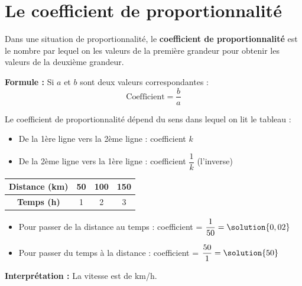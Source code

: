 \clearpage
\seance

\section{Le coefficient de proportionnalité}

\begin{definitionbox}
	Dans une situation de proportionnalité, le \textbf{coefficient de proportionnalité} est le nombre par lequel on  les valeurs de la première grandeur pour obtenir les valeurs de la deuxième grandeur.

	\textbf{Formule :} Si $a$ et $b$ sont deux valeurs correspondantes :
	$$\text{Coefficient} = \dfrac{b}{a}$$
\end{definitionbox}

\begin{remarkbox}
	Le coefficient de proportionnalité dépend du sens dans lequel on lit le tableau :
	\begin{itemize}
		\item De la 1ère ligne vers la 2ème ligne : coefficient $k$
		\item De la 2ème ligne vers la 1ère ligne : coefficient $\dfrac{1}{k}$ (l'inverse)
	\end{itemize}
\end{remarkbox}

\begin{examplebox}
	\begin{center}
		\renewcommand{\arraystretch}{1.5}
		\begin{tabular}{|c|c|c|c|}
			\hline
			\textbf{Distance (km)} & 50 & 100 & 150 \\
			\hline
			\textbf{Temps (h)} & 1 & 2 & 3 \\
			\hline
		\end{tabular}
	\end{center}

	\begin{itemize}
		\item Pour passer de la distance au temps : coefficient = $\dfrac{1}{50} = \solution{0,02}$
		\item Pour passer du temps à la distance : coefficient = $\dfrac{50}{1} = \solution{50}$
	\end{itemize}

	\textbf{Interprétation :} La vitesse est de  km/h.
\end{examplebox}

